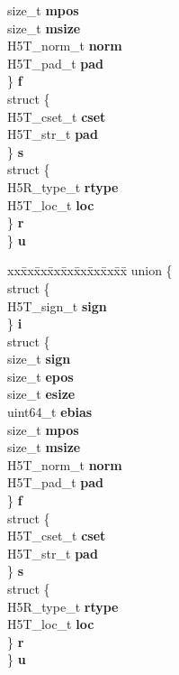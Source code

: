 \begin{DoxyCompactItemize}
\begin{tabbing}
\>\>size\_t {\bfseries mpos}\\
\>\>size\_t {\bfseries msize}\\
\>\>H5T\_norm\_t {\bfseries norm}\\
\>\>H5T\_pad\_t {\bfseries pad}\\
\>\} {\bfseries f}\\
\>struct \{\\
\>\>H5T\_cset\_t {\bfseries cset}\\
\>\>H5T\_str\_t {\bfseries pad}\\
\>\} {\bfseries s}\\
\>struct \{\\
\>\>H5R\_type\_t {\bfseries rtype}\\
\>\>H5T\_loc\_t {\bfseries loc}\\
\>\} {\bfseries r}\\
\} {\bfseries u}\\

\end{tabbing}\item 
\mbox{\label{struct_h5_t__atomic__t_a8a2d72412899bacff280211c46c166dd}} 
\begin{tabbing}
xx\=xx\=xx\=xx\=xx\=xx\=xx\=xx\=xx\=\kill
union \{\\
\>struct \{\\
\>\>H5T\_sign\_t {\bfseries sign}\\
\>\} {\bfseries i}\\
\>struct \{\\
\>\>size\_t {\bfseries sign}\\
\>\>size\_t {\bfseries epos}\\
\>\>size\_t {\bfseries esize}\\
\>\>uint64\_t {\bfseries ebias}\\
\>\>size\_t {\bfseries mpos}\\
\>\>size\_t {\bfseries msize}\\
\>\>H5T\_norm\_t {\bfseries norm}\\
\>\>H5T\_pad\_t {\bfseries pad}\\
\>\} {\bfseries f}\\
\>struct \{\\
\>\>H5T\_cset\_t {\bfseries cset}\\
\>\>H5T\_str\_t {\bfseries pad}\\
\>\} {\bfseries s}\\
\>struct \{\\
\>\>H5R\_type\_t {\bfseries rtype}\\
\>\>H5T\_loc\_t {\bfseries loc}\\
\>\} {\bfseries r}\\
\} {\bfseries u}\\

\end{tabbing}\end{DoxyCompactItemize}


